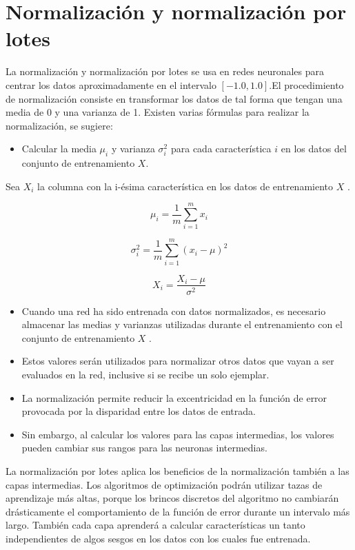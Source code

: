 \section{Normalización y normalización por lotes}

La normalización y normalización por lotes se usa en redes neuronales para centrar los datos aproximadamente en el intervalo $[-1.0, 1.0]$.El procedimiento de normalización consiste en transformar los datos de tal forma que tengan una media de 0 y una varianza de 1.  Existen varias fórmulas para realizar la normalización, se sugiere:
\begin{itemize}
 \item Calcular la media $\mu_i$ y varianza $\sigma_{i}^2$ para cada característica $i$ en los datos del conjunto de entrenamiento $X$.
\end{itemize}

Sea $X_i$ la columna con la i-ésima característica en los datos de entrenamiento $X$ .

\begin{equation}
 \mu_{i} = \dfrac{1}{m}\sum_{i=1}^{m}x_{i} 
\end{equation}

\begin{equation}
 \sigma_{i}^{2} = \dfrac{1}{m}\sum_{i=1}^{m}(x_{i}-\mu)^2 
\end{equation}

\begin{equation}
 X_{i} = \dfrac{X_{i}-\mu}{\sigma^{2}}
\end{equation}

\begin{itemize}
 \item Cuando una red ha sido entrenada con datos normalizados, es necesario almacenar las medias y varianzas utilizadas durante el entrenamiento con el conjunto de entrenamiento $X$ .
 \item Estos valores serán utilizados para normalizar otros datos que vayan a ser evaluados en la red, inclusive si se recibe un solo ejemplar.
 \item La normalización permite reducir la excentricidad en la función de error provocada por la disparidad entre los datos de entrada.
 \item Sin embargo, al calcular los valores para las capas intermedias, los valores pueden cambiar sus rangos para las neuronas intermedias.
\end{itemize}

La normalización por lotes aplica los beneficios de la normalización también a las capas intermedias.
Los algoritmos de optimización podrán utilizar tazas de aprendizaje más altas, porque los brincos discretos del algoritmo no cambiarán drásticamente el comportamiento de la función de error durante un intervalo más largo.
También cada capa aprenderá a calcular características un tanto independientes de algos sesgos en los datos con los cuales fue entrenada.

